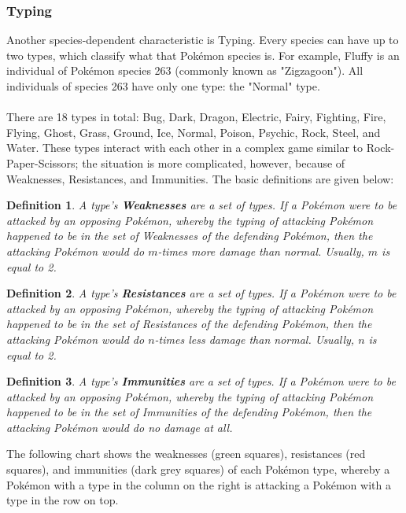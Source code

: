 \documentclass{article}
\newtheorem{definition}{Definition}
\begin{document}
\subsubsection{Typing}
Another species-dependent characteristic is Typing. Every species can have up to two types, which classify what that Pok\'emon species is. For example, Fluffy is an individual of Pok\'emon species 263 (commonly known as "Zigzagoon"). All individuals of species 263 have only one type: the "Normal" type.\\\\
There are 18 types in total: Bug, Dark, Dragon, Electric, Fairy, Fighting, Fire, Flying, Ghost, Grass, Ground, Ice, Normal, Poison, Psychic, Rock, Steel, and Water. These types interact with each other in a complex game similar to Rock-Paper-Scissors; the situation is more complicated, however, because of Weaknesses, Resistances, and Immunities. The basic definitions are given below:
\begin{definition}
	A type's \textbf{Weaknesses} are a set of types. If a Pok\'emon were to be attacked by an opposing Pok\'emon, whereby the typing of attacking Pok\'emon happened to be in the set of Weaknesses of the defending Pok\'emon, then the attacking Pok\'emon would do $m$-times more damage than normal. Usually, $m$ is equal to 2.
\end{definition}
\begin{definition}
	A type's \textbf{Resistances} are a set of types. If a Pok\'emon were to be attacked by an opposing Pok\'emon, whereby the typing of attacking Pok\'emon happened to be in the set of Resistances of the defending Pok\'emon, then the attacking Pok\'emon would do $n$-times less damage than normal. Usually, $n$ is equal to 2.
\end{definition}
\begin{definition}
	A type's \textbf{Immunities} are a set of types. If a Pok\'emon were to be attacked by an opposing Pok\'emon, whereby the typing of attacking Pok\'emon happened to be in the set of Immunities of the defending Pok\'emon, then the attacking Pok\'emon would do no damage at all.
\end{definition}
The following chart shows the weaknesses (green squares), resistances (red squares), and immunities (dark grey squares) of each Pok\'emon type, whereby a Pok\'emon with a type in the column on the right is attacking a Pok\'emon with a type in the row on top.
\end{document}
